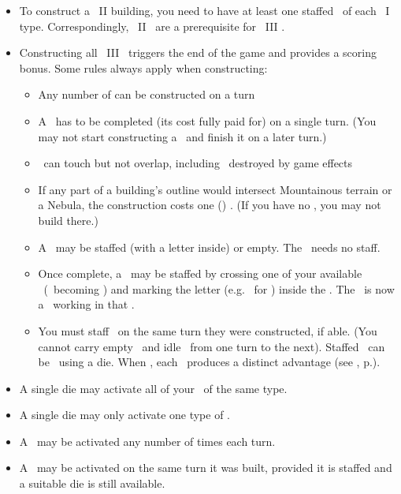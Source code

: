 \begin{itemize}
	\item To construct a \level\ II building, you need to have at least one staffed \fortification\ of each \level\ I type. Correspondingly, \level\ II \fortifications\ are a prerequisite for \level\ III \fortifications.
	\item Constructing all \level\ III \fortifications\ triggers the end of the game and provides a scoring bonus.  Some rules always apply when constructing:
  \begin{itemize}
    \item Any number of \fortifications can be constructed on a turn
    \item A \fortification\ has to be completed (its cost fully paid for) on a single turn. (You may not start constructing a \fortification\ and finish it on a later turn.)
    \item \fortifications\ can touch but not overlap, including \fortifications\ destroyed by game effects
    \item If any part of a building’s outline would intersect Mountainous terrain or a Nebula, the construction costs one (\spendcurrency) \currency. (If you have no \currency, you may not build there.)
    \item A \fortification\ may be staffed (with a letter inside) or empty.  The \spacestation\ needs no staff.
    \item Once complete, a \fortification\ may be staffed by crossing one of your available \astronauts\ (\gainastronautsymbol\ becoming \useastronautsymbol) and marking the letter (e.g. \academysymbol\ for \academy) inside the \fortification. The \astronaut\ is now a \specialist\ working in that \fortification.
    \item You must staff \fortifications\ on the same turn they were constructed, if able. (You cannot carry empty \fortifications\ and idle \astronauts\ from one turn to the next).  Staffed \fortifications\ can be \activated\ using a die.  When \activated, each \fortification\ produces a distinct advantage (see , p.\pageref{sec:fortifications}).
  \end{itemize}
  \item A single die may activate all of your \fortifications\ of the same type.
  \item A single die may only activate one type of \fortification.
  \item A \fortification\ may be activated any number of times each turn.
  \item A \fortification\ may be activated on the same turn it was built, provided it is staffed and a suitable die is still available.
\end{itemize}
